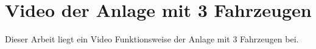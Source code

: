 \section{Video der Anlage mit 3 Fahrzeugen}
	Dieser Arbeit liegt ein Video Funktionsweise der Anlage mit 3 Fahrzeugen bei.
	
	\clearpage
	
	
		
	\clearpage
	\listoffigures
	
	\clearpage
	\listoftables
	
